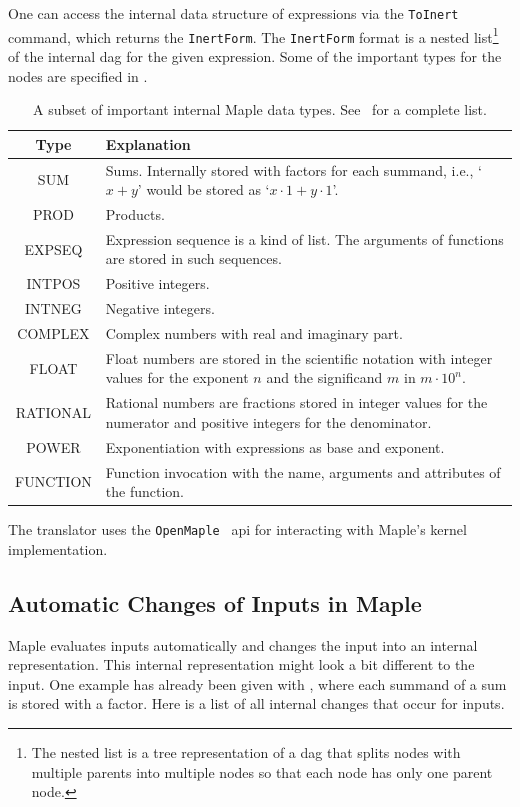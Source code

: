 \documentclass[a4paper,11pt]{article}
\newcommand{\Maple}{Maple}
\newcommand{\inertF}{\texttt{InertForm}}
\theoremstyle{defTheoStyle}
\theoremstyle{defExampStyle}
\begin{document}
One can access the internal data structure of expressions via the \texttt{ToInert} command, which returns the \inertF. The \inertF{} format is a nested list\footnote{The nested list is a tree representation of a \gls*{dag} that splits nodes with multiple parents into multiple nodes so that each node has only one parent node.} of the internal \gls*{dag} for the given expression. Some of the important types for the nodes are specified in .
\begin{table}[h]
\centering
\begin{tabular}{cp{10cm}}
	\hline
	Type & Explanation\\
	\hline
	SUM & Sums. Internally stored with factors for each summand, i.e., `$x+y$' would be stored as `$x \cdot 1 + y \cdot 1$'.\\
	PROD & Products.\\
	EXPSEQ & Expression sequence is a kind of list. The arguments of functions are stored in such sequences.\\
	INTPOS & Positive integers.\\
	INTNEG & Negative integers.\\
	COMPLEX & Complex numbers with real and imaginary part.\\
	FLOAT & Float numbers are stored in the scientific notation with integer values for the exponent $n$ and the significand $m$ in $m \cdot 10^n$.\\
	RATIONAL & Rational numbers are fractions stored in integer values for the numerator and positive integers for the denominator.\\
	POWER & Exponentiation with expressions as base and exponent.\\
	FUNCTION & Function invocation with the name, arguments and attributes of the function.\\
	\hline
\end{tabular}
\caption{A subset of important internal \Maple{} data types. See~\parencite{MAPLE:ProgrammingGuide} for a complete list.}
\label{tab:maple-types}
\end{table}
The translator uses the \texttt{OpenMaple}~\parencite[\S 14.3]{MAPLE:ProgrammingGuide} \gls*{api} for interacting with \Maple's kernel implementation.

\subsection{Automatic Changes of Inputs in Maple}\label{subsec:maple-probs}
\Maple{} evaluates inputs automatically and changes the input into an internal representation. This internal representation might look a bit different to the input. One example has already been given with , where each summand of a sum is stored with a factor. Here is a list of all internal changes that occur for inputs.
\end{document}
